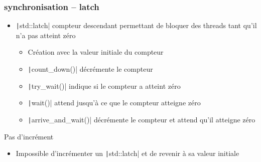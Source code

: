 \documentclass[C++.tex]{subfiles}
\begin{document}
\begin{frame}[fragile]
	\frametitle{synchronisation -- latch}
	\begin{itemize}
		\item \texttt|std::latch| compteur descendant permettant de bloquer des threads tant qu'il n'a pas atteint zéro 
		\begin{itemize}
			\item Création avec la valeur initiale du compteur
			\item \texttt|count_down()| décrémente le compteur
			\item \texttt|try_wait()| indique si le compteur a atteint zéro
			\item \texttt|wait()| attend jusqu'à ce que le compteur atteigne zéro
			\item \texttt|arrive_and_wait()| décrémente le compteur et attend qu'il atteigne zéro
		\end{itemize}
	\end{itemize}

	\begin{alertblock}{Pas d'incrément}
		\begin{itemize}
			\item Impossible d'incrémenter un \texttt|std::latch| et de revenir à sa valeur initiale
		\end{itemize}
	\end{alertblock}


\end{frame}
\end{document}
